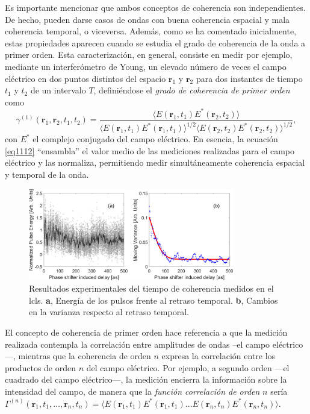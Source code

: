 Es importante mencionar que ambos conceptos de coherencia son independientes. De hecho, pueden darse casos de ondas con buena coherencia espacial y mala coherencia temporal, o viceversa. Además, como se ha comentado inicialmente, estas propiedades aparecen cuando se estudia el grado de coherencia de la onda a primer orden. Esta caracterización, en general, consiste en medir por ejemplo, mediante un interferómetro de Young, un elevado número de veces el campo eléctrico en dos puntos distintos del espacio $\symbf{r}_1$ y $\symbf{r}_2$ para dos instantes de tiempo $t_1$ y $t_2$ de un intervalo $T$, definiéndose el \emph{grado de coherencia de primer orden} como
\begin{equation}
    \label{eq1112}
    \gamma^{(1)}(\symbf{r}_1,\symbf{r}_2,t_1,t_2) = \dfrac{\langle E(\symbf{r}_1,t_1)E^*(\symbf{r}_2,t_2)\rangle}{\langle E(\symbf{r}_1,t_1)E^*(\symbf{r}_1,t_1) \rangle^{1/2} \langle E(\symbf{r}_2,t_2)E^*(\symbf{r}_2,t_2) \rangle^{1/2}},
\end{equation}
con $E^*$ el complejo conjugado del campo eléctrico. En esencia, la ecuación \eqref{eq1112} \enquote{ensambla} el valor medio de las mediciones realizadas para el campo eléctrico y las normaliza, permitiendo medir simultáneamente coherencia espacial y temporal de la onda.

\begin{figure}[ht!]
    \centering
    \includegraphics[width=0.8\textwidth]{Figuras/ch1_coher.png}
    \caption{Resultados experimentales del tiempo de coherencia medidos en el \acrshort{lcls}\autocite{Zhou2020AttosecondLaser}. \textbf{a}, Energía de los pulsos frente al retraso temporal. \textbf{b}, Cambios en la varianza respecto al retraso temporal.}
    \label{figch1_coher}
\end{figure}

El concepto de coherencia de primer orden hace referencia a que la medición realizada contempla la correlación entre amplitudes de ondas --el campo eléctrico---, mientras que la coherencia de orden $n$ expresa la correlación entre los productos de orden $n$ del campo eléctrico. Por ejemplo, a segundo orden ---el cuadrado del campo eléctrico---, la medición encierra la información sobre la intensidad del campo, de manera que la \emph{función correlación de orden} $n$ sería $\Gamma^{(n)}(\symbf{r}_1,t_1,\ldots,\symbf{r}_n,t_n) = \langle E(\symbf{r}_1,t_1)E^*(\symbf{r}_1,t_1)\ldots E(\symbf{r}_n,t_n)E^*(\symbf{r}_n,t_n)\rangle$.

